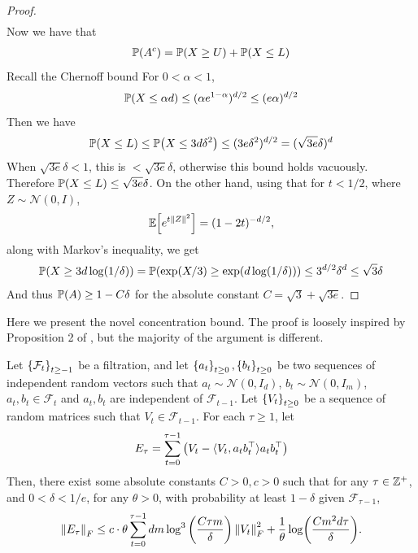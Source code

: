 \begin{proof}
\begin{align*}
    \end{align*} 
    Now we have that
    \begin{align*}
        \P(A^c) = \P(X \geq U) + \P(X \leq L)
    \end{align*}
        Recall the Chernoff bound For $0 < \alpha < 1$,
    \begin{align*}
        \P(X \leq \alpha d) \leq (\alpha e^{1-\alpha})^{d/2} \leq (e \alpha)^{d/2}
    \end{align*}
    Then we have
    \begin{align*}
        \P(X \leq L) \leq \P(X \leq 3d \delta^2) \leq (3e \delta^2)^{d/2} = (\sqrt{3e} \delta)^d
    \end{align*}
    When $\sqrt{3e} \delta < 1$, this is $< \sqrt{3e} \delta$, otherwise this bound holds vacuously. Therefore $\P(X \leq L) \leq \sqrt{3e} \delta$. On the other hand, using that for $t < 1/2$, where $Z \sim \mathcal N(0,I)$,
    \begin{align*}
        \E[e^{t\mg{Z}^2}] = (1-2t)^{-d/2},
    \end{align*}
    along with Markov's inequality, we get
    \begin{align*}
        \P(X \geq 3d \log(1/\delta)) = \P(\exp(X/3) \geq \exp(d \log(1/\delta))) \leq 3^{d/2} \delta^d \leq \sqrt{3} \delta
    \end{align*}
    And thus $\P(A) \geq 1-C\delta$ for the absolute constant $C = \sqrt{3} + \sqrt{3e}$. 
\end{proof}

Here we present the novel concentration bound. The proof is loosely inspired by Proposition 2 of \citet{ren2023escaping}, but the majority of the argument is different.

\begin{theorem}
    \label{thm:error_concentration}
    Let $\set{\mathcal F_t}_{t \geq -1}$ be a filtration, and let $\set{a_t}_{t \geq 0}, \set{b_t}_{t \geq 0} $ be two sequences of independent random vectors such that $a_t \sim \mathcal N(0, I_d)$, $b_t \sim \mathcal N(0, I_m)$, $a_t, b_t \in \mathcal F_t$ and $a_t, b_t$ are independent of $\mathcal F_{t-1}$. Let $\set{V_t}_{t \geq 0}$ be a sequence of random matrices such that $V_t \in \mathcal F_{t-1}$. For each $\tau \geq 1$, let 
    \begin{align*}
        E_\tau = \sum_{t=0}^{\tau-1} \qty(V_t - \langle V_t, a_tb_t^\top \rangle a_t b_t^\top)
    \end{align*}
    Then, there exist some absolute constants $C > 0, c > 0$ such that for any $\tau \in \bZ^+$, and $0 < \delta < 1/e$, for any $\theta > 0$, with probability at least $1-\delta$ given $\mathcal F_{\tau-1}$, 
    \begin{align*}
        \left \|E_{\tau} \right \|_F \leq c \cdot \theta \sum_{t=0}^{\tau-1} dm \log^{3}\qty(\frac{C\tau m}{\delta}) \mg{V_t}_F^2 + \frac{1}{\theta} \log(\frac{Cm^2d \tau}{\delta}).
    \end{align*}
\end{theorem}

